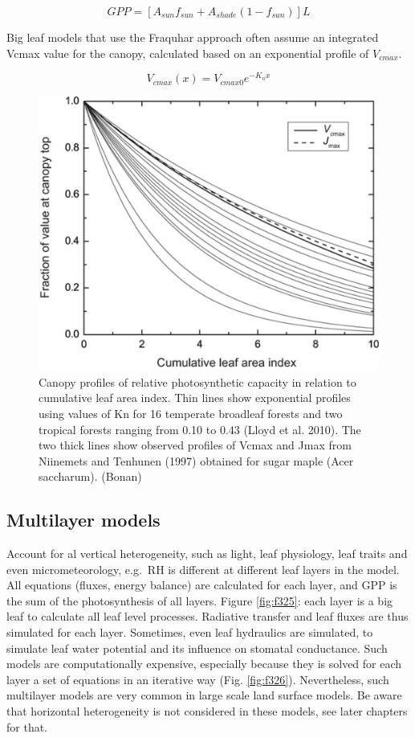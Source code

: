 \documentclass[12pt,oneside]{book}
\begin{document}
\[
GPP = \left[A_{sun} f_{sun} + A_{shade} (1 - f_{sun}) \right]L
\]

Big leaf models that use the Fraquhar approach often assume an
integrated Vcmax value for the canopy, calculated based on an
exponential profile of \(V_{cmax}\).

\[
V_{cmax}(x) = V_{cmax0} e^{-K_n x}
\]

\begin{figure}

{\centering \includegraphics[width=0.8\linewidth]{figures/chap3/f324_vcamx_profile} 

}

\caption{Canopy profiles of relative photosynthetic capacity in relation to cumulative leaf area index. Thin lines show exponential profiles using values of Kn for 16 temperate broadleaf forests and two tropical forests ranging from 0.10 to 0.43 (Lloyd et al. 2010). The two thick lines show observed profiles of Vcmax and Jmax from Niinemets and Tenhunen (1997) obtained for sugar maple (Acer saccharum). (Bonan)}\label{fig:f324}
\end{figure}

\subsection{Multilayer models}\label{multilayer-models}

Account for al vertical heterogeneity, such as light, leaf physiology,
leaf traits and even micrometeorology, e.g.~RH is different at different
leaf layers in the model. All equations (fluxes, energy balance) are
calculated for each layer, and GPP is the sum of the photosynthesis of
all layers. Figure \ref{fig:f325}: each layer is a big leaf to calculate
all leaf level processes. Radiative transfer and leaf fluxes are thus
simulated for each layer. Sometimes, even leaf hydraulics are simulated,
to simulate leaf water potential and its influence on stomatal
conductance. Such models are computationally expensive, especially
because they is solved for each layer a set of equations in an iterative
way (Fig. \ref{fig:f326}). Nevertheless, such multilayer models are very
common in large scale land surface models. Be aware that horizontal
heterogeneity is not considered in these models, see later chapters for
that.
\end{document}
